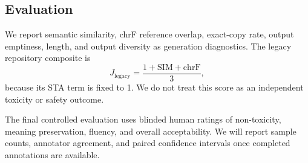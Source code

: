 \subsection{Evaluation}

We report semantic similarity, chrF reference overlap, exact-copy rate, output
emptiness, length, and output diversity as generation diagnostics. The legacy
repository composite is
\[
J_{\mathrm{legacy}} =
\frac{1+\mathrm{SIM}+\mathrm{chrF}}{3},
\]
because its STA term is fixed to 1. We do not treat this score as an independent
toxicity or safety outcome.

The final controlled evaluation uses blinded human ratings of non-toxicity, meaning
preservation, fluency, and overall acceptability. We will report sample counts,
annotator agreement, and paired confidence intervals once completed annotations are
available.
